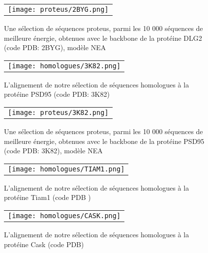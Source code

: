    \begin{figure}[!htbp]
     \centering
     \begin{tabular}{c}
       \texttt{[image: proteus/2BYG.png]} \\
     \end{tabular}
       \caption{Une sélection de séquences proteus, parmi les 10 000 séquences de meilleure énergie, obtenues avec le backbone de la protéine DLG2 (code PDB: 2BYG), modèle NEA}
\label{align_proteus:DLG2}
   \end{figure}
\clearpage

   \begin{figure}[!htbp]
     \centering
     \begin{tabular}{c}
       \texttt{[image: homologues/3K82.png]} \\
     \end{tabular}
     \caption{L'alignement de notre sélection de séquences homologues à la protéine PSD95 (code PDB: 3K82)}
\label{align_homo:PSD95}
   \end{figure}

   \begin{figure}[!htbp]
     \centering
     \begin{tabular}{c}
       \texttt{[image: proteus/3K82.png]} \\
     \end{tabular}
       \caption{Une sélection de séquences proteus, parmi les 10 000 séquences de meilleure énergie, obtenues avec le backbone de la protéine PSD95 (code PDB: 3K82), modèle NEA}
\label{align_proteus:PSD95}
   \end{figure}
\clearpage

   \begin{figure}[!htbp]
     \centering
     \begin{tabular}{c}
       \texttt{[image: homologues/TIAM1.png]} \\
     \end{tabular}
     \caption{L'alignement de notre sélection de séquences homologues à la protéine Tiam1 (code PDB )}
\label{align_homo:Tiam1}
   \end{figure}
\clearpage   
   \begin{figure}[!htbp]
     \centering
     \begin{tabular}{c}
       \texttt{[image: homologues/CASK.png]} \\
     \end{tabular}
     \caption{L'alignement de notre sélection de séquences homologues à la protéine Cask (code PDB)}
   \label{align_homo:CASK}
   \end{figure}
   
\clearpage




